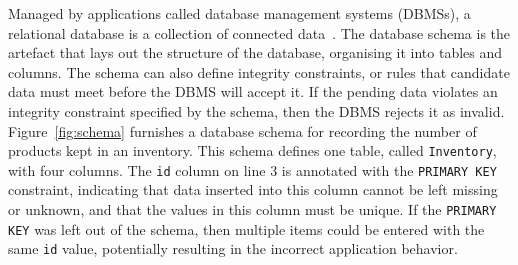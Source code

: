 



Managed by applications called database management systems (DBMSs), a relational database is a collection of connected
data~\cite{databasebook}. The database schema is the artefact that lays out the structure of the database, organising it
into tables and columns.  The schema can also define integrity constraints, or rules that candidate data must meet
before the DBMS will accept it. If the pending data violates an integrity constraint specified by the schema, then the
DBMS rejects it as invalid.  Figure~\ref{fig:schema} furnishes a database schema for recording the number of products
kept in an inventory. This schema defines one table, called \texttt{Inventory}, with four columns.  The \texttt{id}
column on line $3$ is annotated with the \texttt{PRIMARY KEY} constraint, indicating that data inserted into this column
cannot be left missing or unknown, and that the values in this column must be unique. If the \texttt{PRIMARY KEY} was
left out of the schema, then multiple items could be entered with the same \texttt{id} value, potentially resulting in
the incorrect application behavior.

